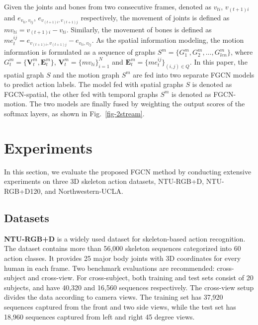 \documentclass[runningheads]{llncs}
\begin{document}
Given the joints and bones from two consecutive frames, denoted as $v_{ti}$, $v_{(t+1)i}$ and $e_{v_{ti},v_{tj}}$, $e_{v_{(t+1)i},v_{(t+1)j}}$ respectively, the movement of joints is defined as $mv_{ti}=v_{(t+1)i}-v_{ti}$. Similarly, the movement of bones is defined as $me_t^{ij}=e_{v_{(t+1)i},v_{(t+1)j}}-e_{v_{ti},v_{tj}}$.
As the spatial information modeling, the motion information is formulated as a sequence of graphs 
$S^m = \{G^m_1, G^m_2,\dots, G^m_{len} \}$, where $G^m_t=\{\textbf{V}^m_t,\textbf{E}^m_t\}$, $\textbf{V}^m_t=\{mv_{ti}\}_{i=1}^N$ and $\textbf{E}^m_t=\{me_t^{ij}\}_{(i,j)\in Q}$. In this paper, the spatial graph $S$ and the motion graph $S^m$ are fed into two separate FGCN models to predict action labels. The model fed with spatial graphs $S$ is denoted as FGCN-spatial, the other fed with temporal graphs $S^m$ is denoted as FGCN-motion. The two models are finally fused by weighting the output scores of the softmax layers, as shown in Fig.~\ref{fig-2stream}.

\vspace{-1mm}
\section{Experiments}
\vspace{-1mm}
In this section, we evaluate the proposed FGCN method by conducting extensive experiments on three 3D skeleton action datasets, NTU-RGB+D, NTU-RGB+D120, and Northwestern-UCLA.


\vspace{-1mm}
\subsection{Datasets}

\hspace{5mm}\textbf{NTU-RGB+D} \cite{shahroudy2016ntu} is a widely used dataset for skeleton-based action recognition. The dataset contains more than 56,000 skeleton sequences categorized into 60 action classes. It provides 25 major body joints with 3D coordinates for every human in each frame. Two benchmark evaluations are recommended: cross-subject and cross-view. For cross-subject, both training and test sets consist of 20 subjects, and have 40,320 and 16,560 sequences respectively. The cross-view setup divides the data according to camera views. The training set has 37,920 sequences captured from the front and two side views, while the test set has 18,960 sequences captured from left and right 45 degree views.
\end{document}

